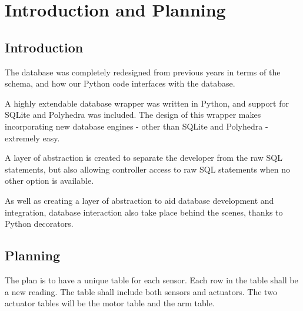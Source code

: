 \section{Introduction and Planning}
\subsection{Introduction}
The database was completely redesigned from previous years in terms of the schema, and how our Python code interfaces with the database.

A highly extendable database wrapper was written in Python, and support for SQLite and Polyhedra was included. The design of this wrapper makes incorporating new database engines - other than SQLite and Polyhedra - extremely easy.

A layer of abstraction is created to separate the developer from the raw SQL statements, but also allowing controller access to raw SQL statements when no other option is available.

As well as creating a layer of abstraction to aid database development and integration, database interaction also take place behind the scenes, thanks to Python decorators.



\subsection{Planning}
The plan is to have a unique table for each sensor. Each row in the table shall be a new reading. The table shall include both sensors and actuators. 
\newline
The two actuator tables will be the motor table and the arm table. 


